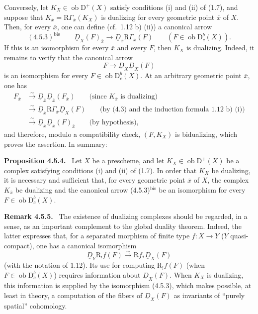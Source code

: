 \documentclass[11pt]{article}
\newenvironment{statement}[1]{\par\medskip\noindent\textbf{#1.}\ }{\par\medskip}
\newcommand{\R}{\mathrm{R}}
\newcommand{\D}{\mathrm{D}}
\newcommand{\ob}{\operatorname{ob}}
\newcommand{\ol}[1]{\overline{#1}}
\providecommand{\ob}{\operatorname{ob}}
\providecommand{\R}{\mathrm R}
\begin{document}
Conversely, let $K_X\in\ob\D^+(X)$ satisfy conditions (i) and (ii) of (1.7), and suppose that $K_{\ol{x}}=\R\Gamma_{\ol{x}}(K_X)$ is dualizing for every geometric point $\ol{x}$ of $X$. Then, for every $\ol{x}$, one can define (cf.~1.12 b) (ii)) a canonical arrow
\[
(4.5.3)^{\mathrm{bis}}\qquad \underline{D}_X(F)_{\ol{x}}\longrightarrow \underline{D}_{\ol{x}}\R\Gamma_{\ol{x}}(F)\qquad (F\in\ob\D_c^b(X)).
\]
If this is an isomorphism for every $\ol{x}$ and every $F$, then $K_X$ is dualizing. Indeed, it remains to verify that the canonical arrow
\[
F\longrightarrow \underline{D}_X\underline{D}_X(F)
\]
is an isomorphism for every $F\in\ob\D_c^b(X)$. At an arbitrary geometric point $\ol{x}$, one has
\[
\begin{aligned}
F_{\ol{x}}&\xrightarrow{\sim}\underline{D}_{\ol{x}}\underline{D}_{\ol{x}}(F_{\ol{x}})\qquad\text{(since $K_{\ol{x}}$ is dualizing)}\\
&\xrightarrow{\sim}\underline{D}_{\ol{x}}\R\Gamma_{\ol{x}}\underline{D}_X(F)\qquad\text{(by (4.3) and the induction formula 1.12 b) (i))}\\
&\xrightarrow{\sim}\underline{D}_{\ol{x}}\underline{D}_{\ol{x}}(F)_{\ol{x}}\qquad\text{(by hypothesis)},
\end{aligned}
\]
and therefore, modulo a compatibility check, $(F,K_X)$ is bidualizing, which proves the assertion. In summary:

\begin{statement}{Proposition 4.5.4}
Let $X$ be a prescheme, and let $K_X\in\ob\D^+(X)$ be a complex satisfying conditions (i) and (ii) of (1.7). In order that $K_X$ be dualizing, it is necessary and sufficient that, for every geometric point $\ol{x}$ of $X$, the complex $K_{\ol{x}}$ be dualizing and the canonical arrow (4.5.3)$^{\mathrm{bis}}$ be an isomorphism for every $F\in\ob\D_c^b(X)$.
\end{statement}

\begin{statement}{Remark 4.5.5}
The existence of dualizing complexes should be regarded, in a sense, as an important complement to the global duality theorem. Indeed, the latter expresses that, for a separated morphism of finite type $f:X\to Y$ ($Y$ quasi-compact), one has a canonical isomorphism
\[
\underline{D}_Y\R_!f(F)\xrightarrow{\sim}\R f_*\underline{D}_X(F)
\]
(with the notation of 1.12). Its use for computing $\R_!f(F)$ (when $F\in\ob\D_c^b(X)$) requires information about $\underline{D}_X(F)$. When $K_X$ is dualizing, this information is supplied by the isomorphism (4.5.3), which makes possible, at least in theory, a computation of the fibers of $\underline{D}_X(F)$ as invariants of ``purely spatial'' cohomology.
\end{statement}
\end{document}
